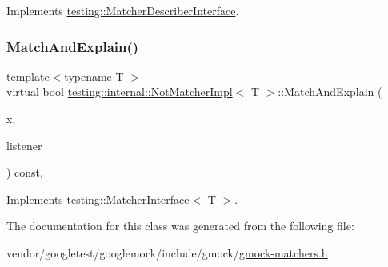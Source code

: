 Implements \hyperlink{classtesting_1_1_matcher_describer_interface_ad9f861588bd969b6e3e717f13bb94e7b}{testing\+::\+Matcher\+Describer\+Interface}.

\mbox{\label{classtesting_1_1internal_1_1_not_matcher_impl_aff3743d9ffcd6dc54b389b5e23caacf3}} 
\subsubsection{\texorpdfstring{Match\+And\+Explain()}{MatchAndExplain()}}
{\footnotesize\ttfamily template$<$typename T $>$ \\
virtual bool \hyperlink{classtesting_1_1internal_1_1_not_matcher_impl}{testing\+::internal\+::\+Not\+Matcher\+Impl}$<$ T $>$\+::Match\+And\+Explain (\begin{DoxyParamCaption}\item[{T}]{x,  }\item[{\hyperlink{classtesting_1_1_match_result_listener}{Match\+Result\+Listener} $\ast$}]{listener }\end{DoxyParamCaption}) const\hspace{0.3cm}{\ttfamily [inline]}, {\ttfamily [virtual]}}



Implements \hyperlink{classtesting_1_1_matcher_interface_a296b43607cd99d60365f0e6a762777cf}{testing\+::\+Matcher\+Interface$<$ T $>$}.



The documentation for this class was generated from the following file\+:\begin{DoxyCompactItemize}
\item 
vendor/googletest/googlemock/include/gmock/\hyperlink{gmock-matchers_8h}{gmock-\/matchers.\+h}\end{DoxyCompactItemize}
